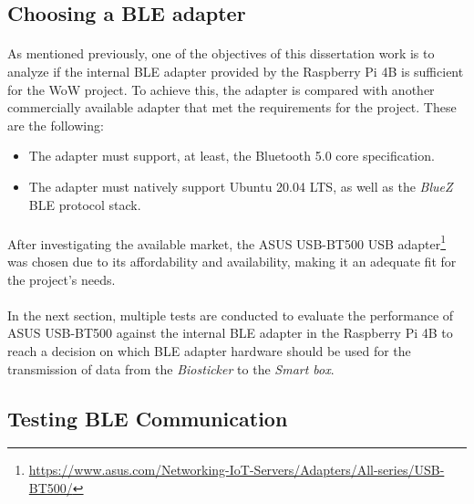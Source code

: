 \subsection{Choosing a \acs{BLE} adapter} 

\paragraph{} As mentioned previously, one of the objectives of this dissertation work is to analyze if the internal \acs{BLE} adapter provided by the Raspberry Pi 4B is sufficient for the \acs{WoW} project. To achieve this, the adapter is compared with another commercially available adapter that met the requirements for the project. These are the following:

\begin{itemize}
    \item The adapter must support, at least, the Bluetooth 5.0 core specification.
    \item The adapter must natively support Ubuntu 20.04 LTS, as well as the \textit{BlueZ} \acs{BLE} protocol stack. 
\end{itemize}

\paragraph{} After investigating the available market, the ASUS USB-BT500 USB adapter\footnote{\url{https://www.asus.com/Networking-IoT-Servers/Adapters/All-series/USB-BT500/}} was chosen due to its affordability and availability, making it an adequate fit for the project's needs.

\paragraph{} In the next section, multiple tests are conducted to evaluate the performance of ASUS USB-BT500 against the internal \acs{BLE} adapter in the Raspberry Pi 4B to reach a decision on which BLE adapter hardware should be used for the transmission of data from the \textit{Biosticker} to the \textit{Smart box}.

\subsection{Testing \acs{BLE} Communication} 

